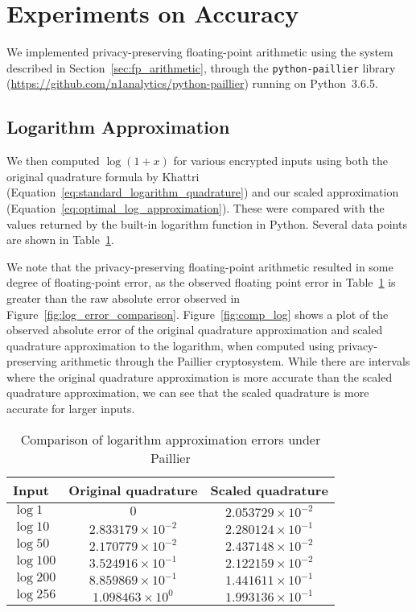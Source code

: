 \section{Experiments on Accuracy}
We implemented privacy-preserving floating-point arithmetic using the system described in Section~\ref{sec:fp_arithmetic}, through the \texttt{python-paillier} library (\url{https://github.com/n1analytics/python-paillier}) running on Python~3.6.5.

\subsection{Logarithm Approximation}
We then computed $\log\left(1+x\right)$ for various encrypted inputs using both the original quadrature formula by Khattri (Equation~\ref{eq:standard_logarithm_quadrature}) and our scaled approximation (Equation~\ref{eq:optimal_log_approximation}). These were compared with the values returned by the built-in logarithm function in Python. Several data points are shown in Table~\ref{tab:log_approximation}.

We note that the privacy-preserving floating-point arithmetic resulted in some degree of floating-point error, as the observed floating point error in Table~\ref{tab:log_approximation} is greater than the raw absolute error observed in Figure~\ref{fig:log_error_comparison}. Figure~\ref{fig:comp_log} shows a plot of the observed absolute error of the original quadrature approximation and scaled quadrature approximation to the logarithm, when computed using privacy-preserving arithmetic through the Paillier cryptosystem. While there are intervals where the original quadrature approximation is more accurate than the scaled quadrature approximation, we can see that the scaled quadrature is more accurate for larger inputs.

\begin{table}[ht]
	\caption{Comparison of logarithm approximation errors under Paillier}
	\label{tab:log_approximation}
	\begin{tabular}{lcc}
		\toprule
		Input & Original quadrature & Scaled quadrature\\
		\midrule
		$\log 1$ & $0$ & $2.053729 \times 10^{-2}$\\
		$\log 10$ & $2.833179 \times 10^{-2} $ & $2.280124 \times 10^{-1}$\\
		$\log 50$ & $2.170779 \times 10^{-2}$ & $2.437148 \times 10^{-2}$\\
		$\log 100$ & $3.524916 \times 10^{-1}$ & $2.122159 \times 10^{-2}$\\
		$\log 200$ & $8.859869 \times 10^{-1}$ & $1.441611 \times 10^{-1}$\\
		$\log 256$ & $1.098463 \times 10^{0}$ & $1.993136 \times 10^{-1}$\\
	\bottomrule
\end{tabular}
\end{table}

